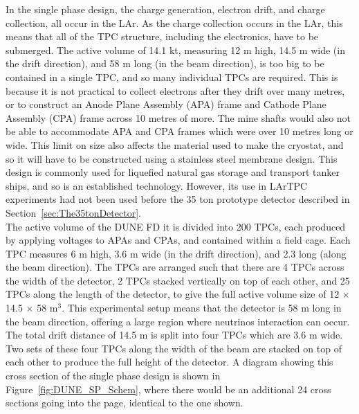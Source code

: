 In the single phase design, the charge generation, electron drift, and charge collection, all occur in the LAr. As the charge collection occurs in the LAr, this means that all of the TPC structure, including the electronics, have to be submerged. The active volume of 14.1 kt, measuring 12 m high, 14.5 m wide (in the drift direction), and 58 m long (in the beam direction), is too big to be contained in a single TPC, and so many individual TPCs are required. This is because it is not practical to collect electrons after they drift over many metres, or to construct an Anode Plane Assembly (APA) frame and Cathode Plane Assembly (CPA) frame across 10 metres of more. The mine shafts would also not be able to accommodate APA and CPA frames which were over 10 metres long or wide. This limit on size also affects the material used to make the cryostat, and so it will have to be constructed using a stainless steel membrane design. This design is commonly used for liquefied natural gas storage and transport tanker ships, and so is an established technology. However, its use in LArTPC experiments had not been used before the 35 ton prototype detector described in Section~\ref{sec:The35tonDetector}. \\

The active volume of the DUNE FD it is divided into 200 TPCs, each produced by applying voltages to APAs and CPAs, and contained within a field cage. Each TPC measures 6 m high, 3.6 m wide (in the drift direction), and 2.3 long (along the beam direction). The TPCs are arranged such that there are 4 TPCs across the width of the detector, 2 TPCs stacked vertically on top of each other, and 25 TPCs along the length of the detector, to give the full active volume size of 12 $\times$ 14.5 $\times$ 58 m$^3$. This experimental setup means that the detector is 58 m long in the beam direction, offering a large region where neutrinos interaction can occur. The total drift distance of 14.5 m is split into four TPCs which are 3.6 m wide. Two sets of these four TPCs along the width of the beam are stacked on top of each other to produce the full height of the detector. A diagram showing this cross section of the single phase design is shown in Figure~\ref{fig:DUNE_SP_Schem}, where there would be an additional 24 cross sections going into the page, identical to the one shown. \\

